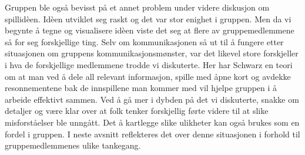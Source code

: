 Gruppen ble også bevisst på et annet problem under videre diskusjon om
spillidèen. Idèen utviklet seg raskt og det var stor enighet i gruppen.
Men da vi begynte å tegne og visualisere idèen viste det seg at flere av
gruppemedlemmene så for seg forskjellige ting. Selv om kommunikasjonen
så ut til å fungere etter situasjonen om gruppens kommunikasjonsmønster,
var det likevel store forskjeller i hva de forskjellige medlemmene
trodde vi diskuterte. Her har Schwarz en teori om at man ved å dele all
relevant informasjon, spille med åpne kort og avdekke resonnementene bak
de innspillene man kommer med vil hjelpe gruppen i å arbeide effektivt
sammen. Ved å gå mer i dybden på det vi diskuterte, snakke om detaljer
og være klar over at folk tenker forskjellig førte videre til at slike
misforståelser ble unngått. Det å kartlegge slike ulikheter
kan også brukes som en fordel i gruppen. I neste avsnitt reflekteres det
over denne situasjonen i forhold til gruppemedlemmenes ulike tankegang.
